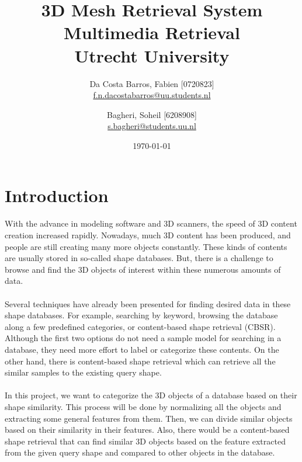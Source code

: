 \documentclass[10pt,twocolumn,letterpaper]{article}
\title{%
  3D Mesh Retrieval System \\
  \large Multimedia Retrieval \\
    Utrecht University}
\author{
  Da Costa Barros, Fabien [0720823]\\
  \url{f.n.dacostabarros@uu.students.nl}
  \and
  Bagheri, Soheil [6208908]\\
  \url{s.bagheri@students.uu.nl}
}
\date{\today}
\begin{document}
\maketitle
{}
\section*{Introduction}
With the advance in modeling software and 3D scanners, the speed of 3D content creation increased rapidly. Nowadays, much 3D content has been produced, and people are still creating many more objects constantly. These kinds of contents are usually stored in so-called shape databases. But, there is a challenge to browse and find the 3D objects of interest within these numerous amounts of data.\\ \\
Several techniques have already been presented for finding desired data in these shape databases. For example, searching by keyword, browsing the database along a few predefined categories, or content-based shape retrieval (CBSR). Although the first two options do not need a sample model for searching in a database, they need more effort to label or categorize these contents. On the other hand, there is content-based shape retrieval which can retrieve all the similar samples to the existing query shape.\\ \\
In this project, we want to categorize the 3D objects of a database based on their shape similarity. This process will be done by normalizing all the objects and extracting some general features from them. Then, we can divide similar objects based on their similarity in their features. Also, there would be a content-based shape retrieval that can find similar 3D objects based on the feature extracted from the given query shape and compared to other objects in the database.
\end{document}
